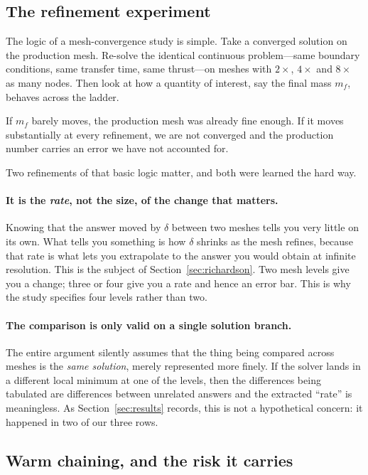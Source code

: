 \documentclass[11pt]{article}
\newcommand{\mf}{m_f}
\begin{document}
\subsection{The refinement experiment}

The logic of a mesh-convergence study is simple. Take a converged solution on
the production mesh. Re-solve the identical continuous problem---same boundary
conditions, same transfer time, same thrust---on meshes with $2\times$,
$4\times$ and $8\times$ as many nodes. Then look at how a quantity of interest,
say the final mass $\mf$, behaves across the ladder.

If $\mf$ barely moves, the production mesh was already fine enough. If it moves
substantially at every refinement, we are not converged and the production
number carries an error we have not accounted for.

Two refinements of that basic logic matter, and both were learned the hard way.

\paragraph{It is the \emph{rate}, not the size, of the change that matters.}
Knowing that the answer moved by $\delta$ between two meshes tells you very
little on its own. What tells you something is how $\delta$ shrinks as the mesh
refines, because that rate is what lets you extrapolate to the answer you would
obtain at infinite resolution. This is the subject of
Section~\ref{sec:richardson}. Two mesh levels give you a change; three or four
give you a rate and hence an error bar. This is why the study specifies four
levels rather than two.

\paragraph{The comparison is only valid on a single solution branch.} The entire
argument silently assumes that the thing being compared across meshes is the
\emph{same solution}, merely represented more finely. If the solver lands in a
different local minimum at one of the levels, then the differences being
tabulated are differences between unrelated answers and the extracted ``rate''
is meaningless. As Section~\ref{sec:results} records, this is not a hypothetical
concern: it happened in two of our three rows.

\subsection{Warm chaining, and the risk it carries}
\end{document}
